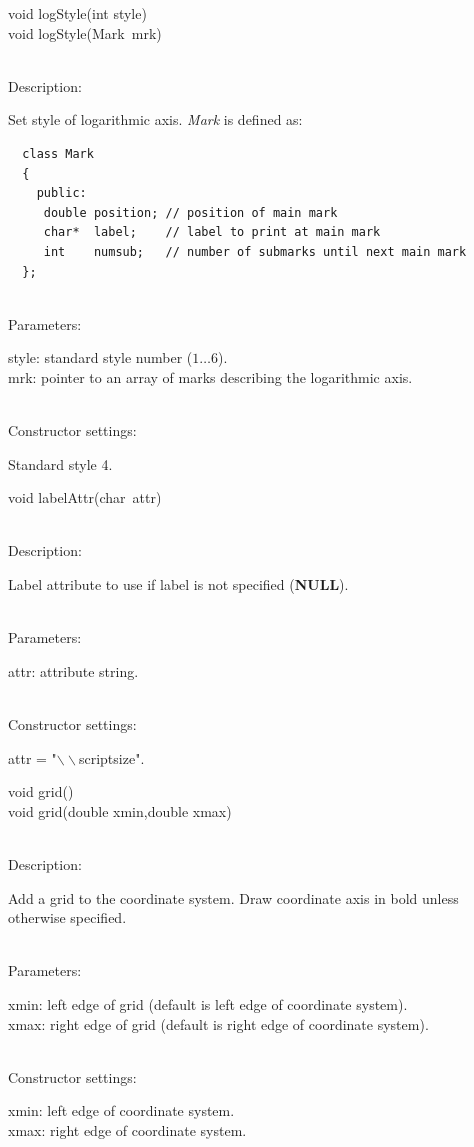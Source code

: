 \documentclass[12pt,a4paper]{article}
\newcommand{\memberitem}[1]{
                              \vspace{-0.5pc}
                              \end{minipage}\\
                              \phantom{M}#1:\\
                              \phantom{MM}
                              \begin{minipage}[t]{12cm}

                           }
\newcommand{\memdsc}{\memberitem{Description}}
\newcommand{\meminp}{\memberitem{Parameters}}
\newcommand{\memdef}{\memberitem{Constructor settings}}
\newenvironment{MemberDescr}
  {
    \begin{minipage}{15cm}
    \bf
  }
  {
    \end{minipage}
  }
\newcommand{\pntr}{\raisebox{-0.25em}{*}\ }
\begin{document}
  \begin{MemberDescr}
    void logStyle(int style)\\
    void logStyle(Mark\pntr mrk)\\
    \memdsc
      Set style of logarithmic axis. \textit{Mark} is defined as:\\
    \vspace{-1pc}
\begin{lstlisting}
  class Mark
  {
    public:
     double position; // position of main mark
     char*  label;    // label to print at main mark
     int    numsub;   // number of submarks until next main mark
  };

\end{lstlisting}

    \meminp
      style: standard style number ($1\ldots6$).\\
      mrk:   pointer to an array of marks describing the logarithmic axis.\\
    \memdef
      Standard style 4.\\
  \end{MemberDescr}

  \begin{MemberDescr}
    void labelAttr(char\pntr attr)\\
    \memdsc
      Label attribute to use if label is not specified (\textbf{NULL}).\\
    \meminp
      attr: attribute string.\\
    \memdef
      attr = "$\backslash\backslash$scriptsize".\\
  \end{MemberDescr}

  \begin{MemberDescr}
    void grid()\\
    void grid(double xmin,double xmax)\\
    \memdsc
      Add a grid to the coordinate system. Draw coordinate axis in bold unless
      otherwise specified.\\
    \meminp
      xmin: left edge of grid (default is left edge of coordinate system).\\
      xmax: right edge of grid (default is right edge of coordinate system).\\
    \memdef
      xmin: left edge of coordinate system.\\
      xmax: right edge of coordinate system.\\
  \end{MemberDescr}
\end{document}
